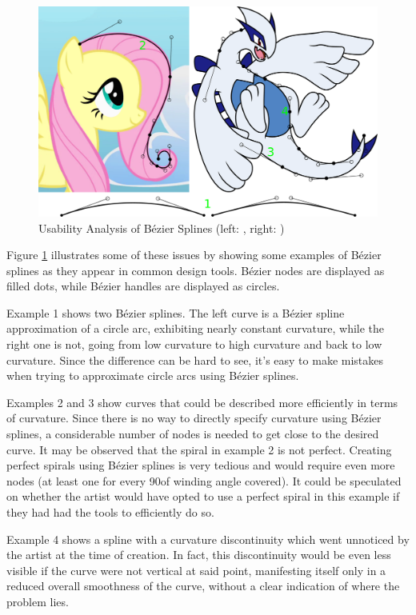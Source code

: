 \documentclass[a4paper]{article}
\begin{document}
				\begin{figure}[htb]
					\centering
					\includegraphics[width=\textwidth]{../resources/usability_bezier.pdf}
					\caption{Usability Analysis of Bézier Splines (left: \cite{Fluttershy}, right: \cite{Lugia})}
					\label{figure:usability_bézier}
				\end{figure}

				Figure \ref{figure:usability_bézier} illustrates some of these issues by showing some examples of Bézier splines as they appear in common design tools. Bézier nodes are displayed as filled dots, while Bézier handles are displayed as circles.

				Example 1 shows two Bézier splines. The left curve is a Bézier spline approximation of a circle arc, exhibiting nearly constant curvature, while the right one is not, going from low curvature to high curvature and back to low curvature. Since the difference can be hard to see, it's easy to make mistakes when trying to approximate circle arcs using Bézier splines.

				Examples 2 and 3 show curves that could be described more efficiently in terms of curvature. Since there is no way to directly specify curvature using Bézier splines, a considerable number of nodes is needed to get close to the desired curve. It may be observed that the spiral in example 2 is not perfect. Creating perfect spirals using Bézier splines is very tedious and would require even more nodes (at least one for every 90\textdegree of winding angle covered). It could be speculated on whether the artist would have opted to use a perfect spiral in this example if they had had the tools to efficiently do so.

				Example 4 shows a spline with a curvature discontinuity which went unnoticed by the artist at the time of creation. In fact, this discontinuity would be even less visible if the curve were not vertical at said point, manifesting itself only in a reduced overall smoothness of the curve, without a clear indication of where the problem lies.
\end{document}
